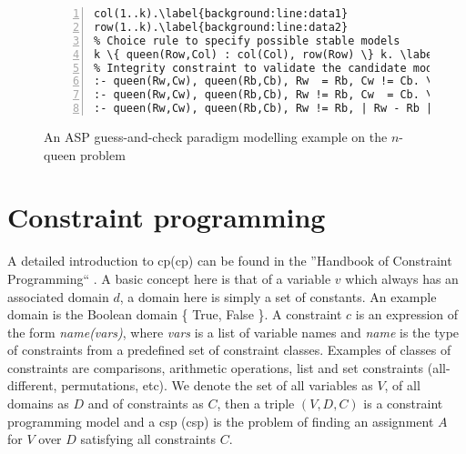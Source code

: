 \begin{figure}[H] 
\renewcommand\figurename{Listing}
\begin{Verbatim}[fontsize=\small,numbers=left,xleftmargin=0mm,commandchars=\\\{\},frame=single]
% Data specifying the board
col(1..k).\label{background:line:data1}
row(1..k).\label{background:line:data2}
% Choice rule to specify possible stable models
k \{ queen(Row,Col) : col(Col), row(Row) \} k. \label{background:line:choice}
% Integrity constraint to validate the candidate models
:- queen(Rw,Cw), queen(Rb,Cb), Rw  = Rb, Cw != Cb. \label{background:line:int1}
:- queen(Rw,Cw), queen(Rb,Cb), Rw != Rb, Cw  = Cb. \label{background:line:int2}
:- queen(Rw,Cw), queen(Rb,Cb), Rw != Rb, | Rw - Rb | = | Cw - Cb |.\label{background:line:int3}
\end{Verbatim}
\caption{An ASP guess-and-check paradigm modelling example on the $n$-queen problem}
\label{lst:n_queens_example_modelling}
\end{figure}


\section{Constraint programming}
A detailed introduction to \acrlong{cp}(\acrshort{cp}) can be found in the ''Handbook of Constraint Programming`` \parencite{handbookcp}. A basic concept here is that of a variable $v$ which always has an associated domain $d$, a domain here is simply a set of constants. An example domain is the Boolean domain \{ True, False \}. A constraint $c$ is an expression of the form \textit{name(vars)}, where \textit{vars} is a list of variable names and \textit{name} is the type of constraints from a predefined set of constraint classes. Examples of classes of constraints are comparisons,   arithmetic operations, list and set constraints (all-different, permutations, etc). We denote the set of all variables as $V$, of all domains as $D$ and of constraints as $C$, then a triple $(V,D,C)$ is a constraint programming model and a \acrlong{csp} (\acrshort{csp}) is the problem of finding an assignment $A$ for $V$ over $D$ satisfying all constraints $C$.

